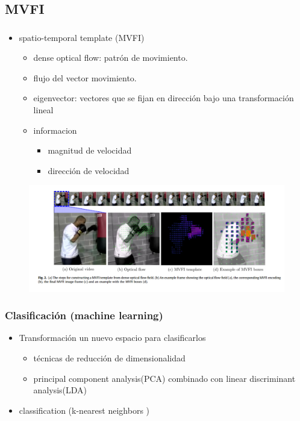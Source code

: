 \documentclass{beamer}
\begin{document}
  
 

\subsection{MVFI}
 
\begin{frame}
\frametitle{}
 
\begin{itemize}
\item spatio-temporal template (MVFI)
  \begin{itemize}
  \item dense optical flow: patrón de movimiento.
  \item flujo del vector movimiento.
  \item eigenvector: vectores que se fijan en dirección bajo una transformación lineal
  \item informacion
          \begin{itemize}
          \item magnitud de velocidad
          \item dirección de velocidad
          \end{itemize}
  \end{itemize}
\end{itemize}
  \begin{figure}
     \includegraphics[width=0.8\linewidth]{img2/Selection_021.png} 
    \end{figure}
 
\end{frame}

\begin{frame}
\frametitle{Clasificación (machine learning)}
\begin{itemize}
\item Transformación un nuevo espacio para clasificarlos
	\begin{itemize}
      \item técnicas de reducción de dimensionalidad 
      \item principal component analysis(PCA) combinado con linear discriminant analysis(LDA)
	\end{itemize}
\item classification (k-nearest neighbors )

\end{itemize}
\end{frame}
 
\end{document}
